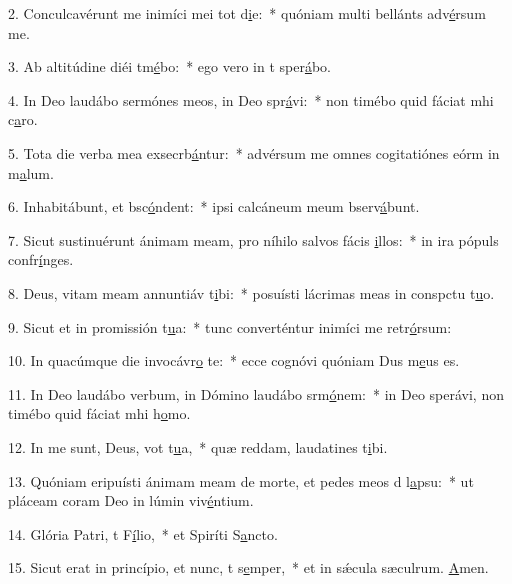 2. Conculcavérunt me inimíci mei tot d\uline{i}e:~* quóniam multi bellánts adv\uline{é}rsum me.\par 
3. Ab altitúdine diéi tm\uline{é}bo:~* ego vero in t sper\uline{á}bo.\par 
4. In Deo laudábo sermónes meos, in Deo spr\uline{á}vi:~* non timébo quid fáciat mhi c\uline{a}ro.\par 
5. Tota die verba mea exsecrb\uline{á}ntur:~* advérsum me omnes cogitatiónes eórm in m\uline{a}lum.\par 
6. Inhabitábunt, et bsc\uline{ó}ndent:~* ipsi calcáneum meum bserv\uline{á}bunt.\par 
7. Sicut sustinuérunt ánimam meam, pro níhilo salvos fácis \uline{i}llos:~* in ira pópuls confr\uline{í}nges.\par 
8. Deus, vitam meam annuntiáv t\uline{i}bi:~* posuísti lácrimas meas in conspctu t\uline{u}o.\par 
9. Sicut et in promissión t\uline{u}a:~* tunc converténtur inimíci me retr\uline{ó}rsum:\par 
10. In quacúmque die invocávr\uline{o} te:~* ecce cognóvi quóniam Dus m\uline{e}us es.\par 
11. In Deo laudábo verbum, in Dómino laudábo srm\uline{ó}nem:~* in Deo sperávi, non timébo quid fáciat mhi h\uline{o}mo.\par 
12. In me sunt, Deus, vot t\uline{u}a,~* quæ reddam, laudatines t\uline{i}bi.\par 
13. Quóniam eripuísti ánimam meam de morte, et pedes meos d l\uline{a}psu:~* ut pláceam coram Deo in lúmin viv\uline{é}ntium.\par 
14. Glória Patri, t F\uline{í}lio,~* et Spiríti S\uline{a}ncto.\par 
15. Sicut erat in princípio, et nunc, t s\uline{e}mper,~* et in sǽcula sæculrum. \uline{A}men.\par 
